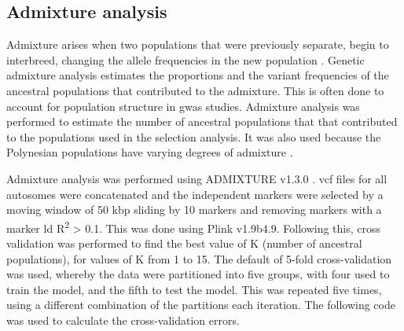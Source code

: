 \documentclass[]{report}
\begin{document}
\subsection{Admixture analysis}\label{admixture}

Admixture arises when two populations that were previously separate,
begin to interbreed, changing the allele frequencies in the new
population \citep{Pritchard2000}. Genetic admixture analysis estimates
the proportions and the variant frequencies of the ancestral populations
that contributed to the admixture. This is often done to account for
population structure in \gls{gwas} studies. Admixture analysis was
performed to estimate the number of ancestral populations that that
contributed to the populations used in the selection analysis. It was
also used because the Polynesian populations have varying degrees of
admixture \citep{Wollstein2010}.

Admixture analysis was performed using ADMIXTURE v1.3.0
\citep{Alexander2009}. \Gls{vcf} files for all autosomes were
concatenated and the independent markers were selected by a moving
window of 50 kbp sliding by 10 markers and removing markers with a
marker \gls{ld} R\textsuperscript{2} \textgreater{} 0.1. This was done
using Plink v1.9b4.9. Following this, cross validation was performed to
find the best value of K (number of ancestral populations), for values
of K from 1 to 15. The default of 5-fold cross-validation was used,
whereby the data were partitioned into five groups, with four used to
train the model, and the fifth to test the model. This was repeated five
times, using a different combination of the partitions each iteration.
The following code was used to calculate the cross-validation errors.
\end{document}
